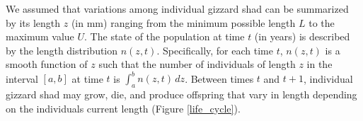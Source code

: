 \documentclass[preprint,review,12pt,authoryear]{elsarticle}
\def\ds{\displaystyle}
\begin{document}
We assumed that variations among individual gizzard shad can be summarized by its length $z$ (in mm) ranging from the minimum possible length $L$ to the maximum value $U$. 
The state of the population at time $t$ (in years) is described by the length distribution $n(z,t)$. 
Specifically, for each time $t$, $n(z,t)$ is a smooth function of $z$ such that the number of individuals of length $z$ in the interval $[a,b]$ at time $t$ is $\ds \int_a^b n(z,t) \, dz$. 
Between times $t$ and $t+1$, individual gizzard shad may grow, die, and produce offspring that vary in length depending on the individuals current length (Figure \ref{life_cycle}). 

\begin{figure}
    \begin{center}
\begin{tikzpicture}[->,>=stealth',shorten >=1pt,auto,node distance=3cm,
  thick,
  main node/.style={rectangle,draw},
  box/.style = {draw=gray, very thick,
                            minimum height=11mm, text width=11mm, 
                            align=center},]
                              

\end{tikzpicture}
\end{center}
\end{figure}
\end{document}
